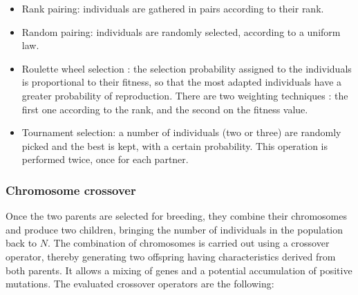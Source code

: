 \documentclass{ametsoc}
\begin{document}
\begin{itemize}
	\item Rank pairing: individuals are gathered in pairs according to their rank.
	
	\item Random pairing: individuals are randomly selected, according to a uniform law.
	
	\item Roulette wheel selection \citep{Goldberg1989}: the selection probability assigned to the individuals is proportional to their fitness, so that the most adapted individuals have a greater probability of reproduction. There are two weighting techniques : the first one according to the rank, and the second on the fitness value.
	
	\item Tournament selection: a number of individuals (two or three) are randomly picked and the best is kept, with a certain probability. This operation is performed twice, once for each partner.
\end{itemize}


\subsubsection{Chromosome crossover}
\label{sec:gas:crossover}

Once the two parents are selected for breeding, they combine their chromosomes and produce two children, bringing the number of individuals in the population back to $N$. The combination of chromosomes is carried out using a crossover operator, thereby generating two offspring having characteristics derived from both parents. It allows a mixing of genes and a potential accumulation of positive mutations. The evaluated crossover operators are the following:
\end{document}

